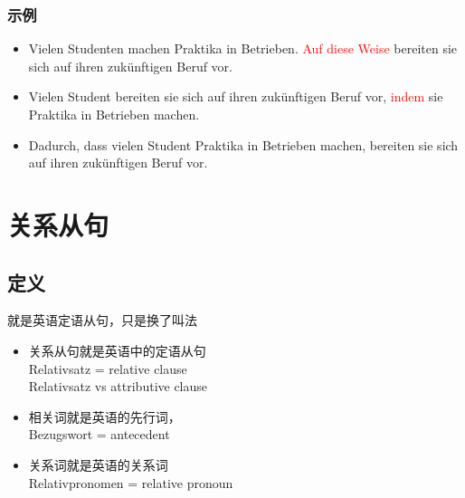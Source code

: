 \subsubsection{示例}
\begin{itemize}
    \item Vielen Studenten machen Praktika in Betrieben. \textcolor{red}{Auf diese Weise} bereiten sie sich auf ihren zukünftigen Beruf vor.
    \item Vielen Student bereiten sie sich auf ihren zukünftigen Beruf vor, \textcolor{red}{indem} sie Praktika in Betrieben machen.
    \item Dadurch, dass vielen Student Praktika in Betrieben machen, bereiten sie sich auf ihren zukünftigen Beruf vor.
\end{itemize}

\section{关系从句}
\subsection{定义}
就是英语定语从句，只是换了叫法
\begin{itemize}
    \item 关系从句就是英语中的定语从句 \\
          Relativsatz = relative clause \\
          Relativsatz vs attributive clause
    \item 相关词就是英语的先行词，\\
          Bezugswort = antecedent
    \item 关系词就是英语的关系词 \\
          Relativpronomen = relative pronoun
\end{itemize}

